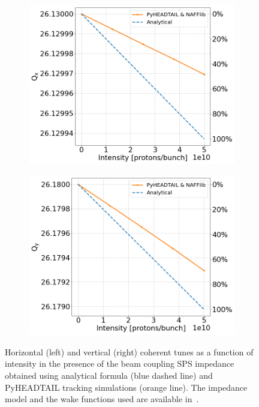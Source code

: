 \begin{figure}[!ht]
    \centering
    \begin{subfigure}[t]{0.45\textwidth}
        \centering
        \includegraphics[width=1\textwidth]{images/Ch7/Qx_vs_intensity_complete_impedance_sps_q26model_MD2018_parameters_integer.png}
    \end{subfigure}
    \hfill
    \begin{subfigure}[t]{0.45\textwidth}
        \centering
        \includegraphics[width=1\textwidth]{images/Ch7/Qy_vs_intensity_complete_impedance_sps_q26model_MD2018_parameters_integer.png}
    \end{subfigure}
    \hfill
     \caption{Horizontal (left) and vertical (right) coherent tunes as a function of intensity in the presence of the beam coupling SPS impedance obtained using analytical formula (blue dashed line) and PyHEADTAIL tracking simulations (orange line). The impedance model and the wake functions used are available in~\cite{sps_impedance_model_git}.} %
     \label{fig:sps_coherent_DQ_vs_intensity_original_complete_model}
 \end{figure}


